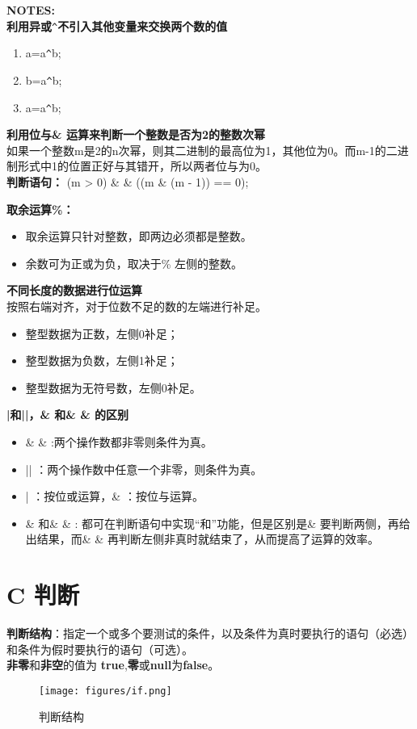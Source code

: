 \documentclass[UTF8]{ctexart}
\begin{document}
	\begin{framed}
		\textbf{NOTES:}\\
		\textbf{利用异或}\verb|^|\textbf{不引入其他变量来交换两个数的值}
		\begin{enumerate}
			\item a=a\verb|^|b;
			\item b=a\verb|^|b;
			\item a=a\verb|^|b;
		\end{enumerate}
		\textbf{利用位与\& 运算来判断一个整数是否为2的整数次幂}\\如果一个整数m是2的n次幂，则其二进制的最高位为1，其他位为0。而m-1的二进制形式中1的位置正好与其错开，所以两者位与为0。\\ \textbf{判断语句：} (m > 0) \& \& ((m \& (m - 1)) == 0);

		\textbf{取余运算\%：}\begin{itemize}
			\item 取余运算只针对整数，即两边必须都是整数。
			\item 余数可为正或为负，取决于\% 左侧的整数。
		\end{itemize}
		\textbf{不同长度的数据进行位运算}\\按照右端对齐，对于位数不足的数的左端进行补足。\begin{itemize}
			\item 整型数据为正数，左侧0补足；
			\item 整型数据为负数，左侧1补足；
			\item 整型数据为无符号数，左侧0补足。
		\end{itemize}
		\textbf{|和||，\& 和\& \& 的区别}
		\begin{itemize}
			\item \& \& :两个操作数都非零则条件为真。
			\item || ：两个操作数中任意一个非零，则条件为真。
			\item | ：按位或运算，\& ：按位与运算。
			\item \& 和\& \& : 都可在判断语句中实现“和”功能，但是区别是\& 要判断两侧，再给出结果，而\& \& 再判断左侧非真时就结束了，从而提高了运算的效率。
		\end{itemize}
	\end{framed}

	\clearpage
	\section{C 判断}
	\textbf{判断结构}：指定一个或多个要测试的条件，以及条件为真时要执行的语句（必选）和条件为假时要执行的语句（可选）。\\ \textbf{非零}和\textbf{非空}的值为 \textbf{true},\textbf{零}或\textbf{null}为\textbf{false}。
	\begin{figure}
		\centering
		\texttt{[image: figures/if.png]}
		\caption{判断结构}
	\end{figure}
\end{document}
